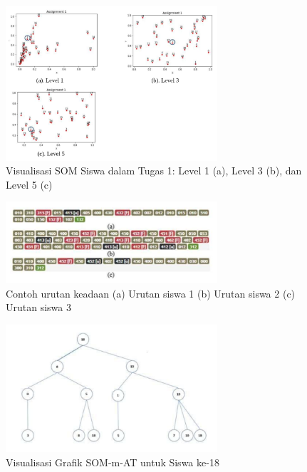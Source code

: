     \begin{figure}[H]
        \centering
        \includegraphics[width=0.7\textwidth]{Gambar/gambar6.3.png}
        \caption{Visualisasi SOM Siswa dalam Tugas 1: Level 1 (a), Level 3 (b), dan Level 5 (c)}
    \end{figure}

    \begin{figure}[H]
        \centering
        \includegraphics[width=0.7\textwidth]{Gambar/gambar6.4.png}
        \caption{Contoh urutan keadaan (a) Urutan siswa 1 (b) Urutan siswa 2 (c) Urutan siswa 3}
    \end{figure}

    \begin{figure}[H]
        \centering
        \includegraphics[width=0.7\textwidth]{Gambar/gambar6.5.png}
        \caption{Visualisasi Grafik SOM-m-AT untuk Siswa ke-18}
    \end{figure}

